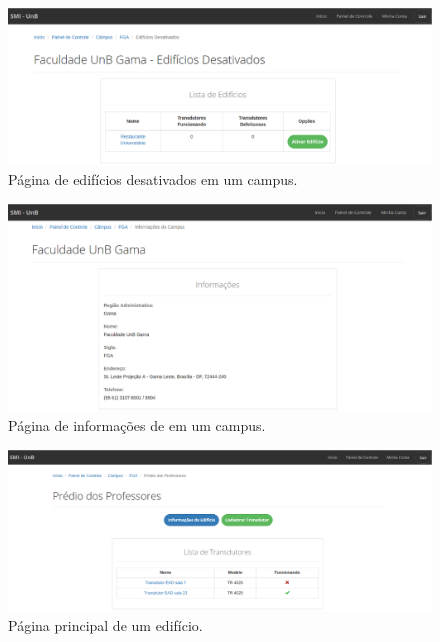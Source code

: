 \begin{anexosenv}
\begin{figure}[!htpb]
    \centering
    \includegraphics[keepaspectratio=true,scale=0.35]{figuras/img8.eps}
    \caption{Página de edifícios desativados em um campus.}
    \label{img8}
\end{figure}

\begin{figure}[!htpb]
    \centering
    \includegraphics[keepaspectratio=true,scale=0.35]{figuras/img9.eps}
    \caption{Página de informações de em um campus.}
    \label{img9}
\end{figure}

\begin{figure}[!htpb]
    \centering
    \includegraphics[keepaspectratio=true,scale=0.35]{figuras/img11.eps}
    \caption{Página principal de um edifício.}
    \label{img11}
\end{figure}


\end{anexosenv}
